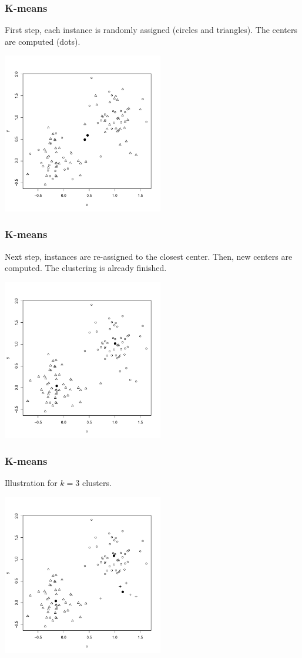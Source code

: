 \begin{frame}
\frametitle{K-means}
First step, each instance is randomly assigned (circles and triangles). The centers are computed (dots).
\begin{center}
\includegraphics[width=7cm]{../../Graphs/kmeans2.pdf}
\end{center}
\end{frame}
\begin{frame}
\frametitle{K-means}
Next step, instances are re-assigned to the closest center. Then, new centers are computed. The clustering is already finished.
\begin{center}
\includegraphics[width=7cm]{../../Graphs/kmeans3.pdf}
\end{center}
\end{frame}
\begin{frame}
\frametitle{K-means}
Illustration for $k=3$ clusters.
\begin{center}
\includegraphics[width=7cm]{../../Graphs/kmeans4.pdf}
\end{center}
\end{frame}
